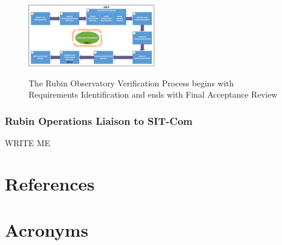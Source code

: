 \documentclass[SE,toc]{lsstdoc}
\begin{document}
\begin{figure}[h]
    \centering
    \caption{The Rubin Observatory Verification Process begins with Requirements Identification and ends with Final Acceptance Review}
    \includegraphics[width=0.5\textwidth]{static/verification_process}
    \label{fig:verification_process}
\end{figure}


\subsubsection{Rubin Operations Liaison to SIT-Com}

WRITE ME


\appendix

\section{References} \label{sec:bib}
\renewcommand{\refname}{} %


\section{Acronyms} \label{sec:acronyms}

\end{document}
